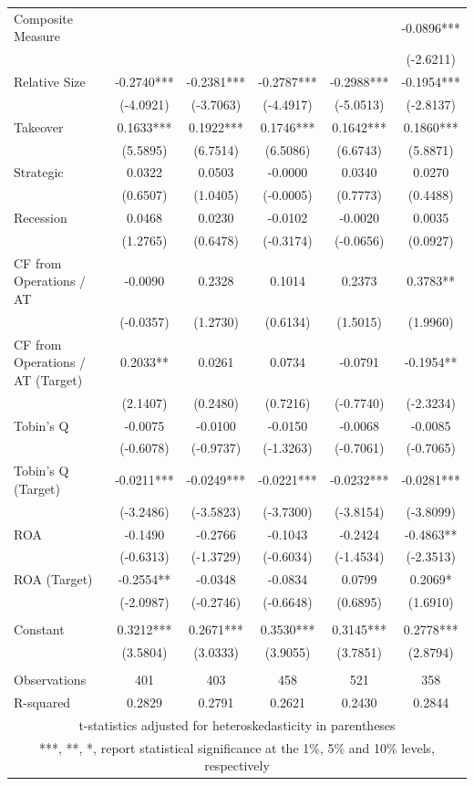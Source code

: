 \documentclass[12pt]{article}
\begin{document}
\begin{table}[!htbp]
\begin{adjustbox}{max width=\textwidth}
\begin{tabular}{lccccc}
			Composite Measure &  &  &  &  & -0.0896*** \\
			 &  &  &  &  & (-2.6211) \\
			Relative Size & -0.2740*** & -0.2381*** & -0.2787*** & -0.2988*** & -0.1954*** \\
			 & (-4.0921) & (-3.7063) & (-4.4917) & (-5.0513) & (-2.8137) \\
			Takeover & 0.1633*** & 0.1922*** & 0.1746*** & 0.1642*** & 0.1860*** \\
			 & (5.5895) & (6.7514) & (6.5086) & (6.6743) & (5.8871) \\
			Strategic & 0.0322 & 0.0503 & -0.0000 & 0.0340 & 0.0270 \\
			 & (0.6507) & (1.0405) & (-0.0005) & (0.7773) & (0.4488) \\
			Recession & 0.0468 & 0.0230 & -0.0102 & -0.0020 & 0.0035 \\
			 & (1.2765) & (0.6478) & (-0.3174) & (-0.0656) & (0.0927) \\
			CF from Operations / AT & -0.0090 & 0.2328 & 0.1014 & 0.2373 & 0.3783** \\
			 & (-0.0357) & (1.2730) & (0.6134) & (1.5015) & (1.9960) \\
			CF from Operations / AT (Target) & 0.2033** & 0.0261 & 0.0734 & -0.0791 & -0.1954** \\
			 & (2.1407) & (0.2480) & (0.7216) & (-0.7740) & (-2.3234) \\
			Tobin's Q & -0.0075 & -0.0100 & -0.0150 & -0.0068 & -0.0085 \\
			 & (-0.6078) & (-0.9737) & (-1.3263) & (-0.7061) & (-0.7065) \\
			Tobin's Q (Target) & -0.0211*** & -0.0249*** & -0.0221*** & -0.0232*** & -0.0281*** \\
			 & (-3.2486) & (-3.5823) & (-3.7300) & (-3.8154) & (-3.8099) \\
			ROA & -0.1490 & -0.2766 & -0.1043 & -0.2424 & -0.4863** \\
			 & (-0.6313) & (-1.3729) & (-0.6034) & (-1.4534) & (-2.3513) \\
			ROA (Target) & -0.2554** & -0.0348 & -0.0834 & 0.0799 & 0.2069* \\
			 & (-2.0987) & (-0.2746) & (-0.6648) & (0.6895) & (1.6910) \\
			 &  &  &  &  &  \\
			Constant & 0.3212*** & 0.2671*** & 0.3530*** & 0.3145*** & 0.2778*** \\
			 & (3.5804) & (3.0333) & (3.9055) & (3.7851) & (2.8794) \\
			 &  &  &  &  &  \\
			Observations & 401 & 403 & 458 & 521 & 358 \\
			 R-squared & 0.2829 & 0.2791 & 0.2621 & 0.2430 & 0.2844 \\ \hline
			\multicolumn{6}{c}{ t-statistics adjusted for heteroskedasticity in parentheses} \\
			\multicolumn{6}{c}{ ***, **, *, report statistical significance at the 1\%, 5\% and 10\% levels, respectively}\\
			\end{tabular}
				

\end{adjustbox}
\end{table}
\end{document}
